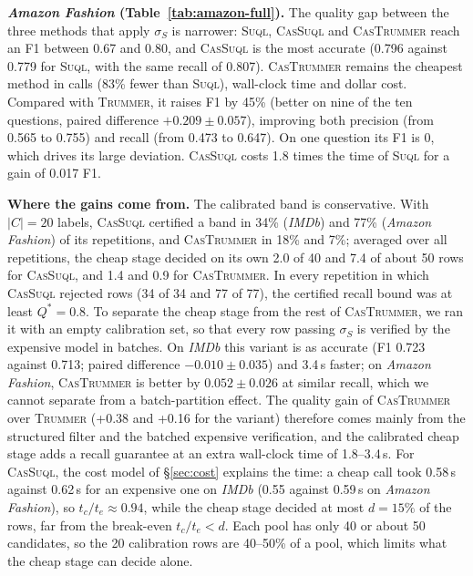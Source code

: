 \documentclass[sigconf]{acmart}
\begin{document}
\textbf{\textit{Amazon Fashion} (Table~\ref{tab:amazon-full}).} The quality gap between the three methods that apply $\sigma_S$ is narrower: \textsc{Suql}, \textsc{CasSuql} and \textsc{CasTrummer} reach an F1 between 0.67 and 0.80, and \textsc{CasSuql} is the most accurate (0.796 against 0.779 for \textsc{Suql}, with the same recall of 0.807). \textsc{CasTrummer} remains the cheapest method in calls (83\% fewer than \textsc{Suql}), wall-clock time and dollar cost. Compared with \textsc{Trummer}, it raises F1 by 45\% (better on nine of the ten questions, paired difference $+0.209\pm0.057$), improving both precision (from 0.565 to 0.755) and recall (from 0.473 to 0.647). On one question its F1 is 0, which drives its large deviation. \textsc{CasSuql} costs 1.8 times the time of \textsc{Suql} for a gain of 0.017 F1.

\textbf{Where the gains come from.} The calibrated band is conservative. With $|C|{=}20$ labels, \textsc{CasSuql} certified a band in 34\% (\textit{IMDb}) and 77\% (\textit{Amazon Fashion}) of its repetitions, and \textsc{CasTrummer} in 18\% and 7\%; averaged over all repetitions, the cheap stage decided on its own 2.0 of 40 and 7.4 of about 50 rows for \textsc{CasSuql}, and 1.4 and 0.9 for \textsc{CasTrummer}. In every repetition in which \textsc{CasSuql} rejected rows (34 of 34 and 77 of 77), the certified recall bound was at least $Q^\ast{=}0.8$. To separate the cheap stage from the rest of \textsc{CasTrummer}, we ran it with an empty calibration set, so that every row passing $\sigma_S$ is verified by the expensive model in batches. On \textit{IMDb} this variant is as accurate (F1 0.723 against 0.713; paired difference $-0.010\pm0.035$) and 3.4\,s faster; on \textit{Amazon Fashion}, \textsc{CasTrummer} is better by $0.052\pm0.026$ at similar recall, which we cannot separate from a batch-partition effect. The quality gain of \textsc{CasTrummer} over \textsc{Trummer} (+0.38 and +0.16 for the variant) therefore comes mainly from the structured filter and the batched expensive verification, and the calibrated cheap stage adds a recall guarantee at an extra wall-clock time of 1.8--3.4\,s. For \textsc{CasSuql}, the cost model of \S\ref{sec:cost} explains the time: a cheap call took 0.58\,s against 0.62\,s for an expensive one on \textit{IMDb} (0.55 against 0.59\,s on \textit{Amazon Fashion}), so $t_c/t_e\approx0.94$, while the cheap stage decided at most $d=15\%$ of the rows, far from the break-even $t_c/t_e<d$. Each pool has only 40 or about 50 candidates, so the 20 calibration rows are 40--50\% of a pool, which limits what the cheap stage can decide alone.
\end{document}
